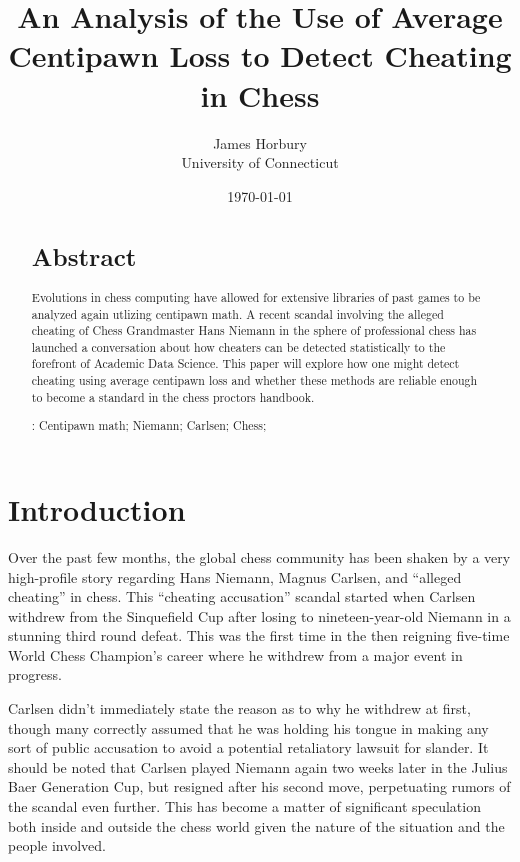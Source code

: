 \documentclass[12pt, letterpaper, titlepage]{article}
\title{An Analysis of the Use of Average Centipawn Loss to Detect Cheating in Chess}
\author{James Horbury\\
    University of Connecticut
}
\date{\today}
\begin{document}
\maketitle

\begin{abstract}
\section*{Abstract}
\label{sec:abs}

Evolutions in chess computing have allowed for extensive libraries of past games to be analyzed again utlizing centipawn math. A recent scandal involving the alleged cheating of Chess Grandmaster Hans Niemann in the sphere of professional chess has launched a conversation about how cheaters can be detected statistically to the forefront of Academic Data Science. This paper will explore how one might detect cheating using average centipawn loss and whether these methods are reliable enough to become a standard in the chess proctors handbook.

\bigskip
\noindent{}:
Centipawn math; 
Niemann;
Carlsen;
Chess;
\end{abstract}

\section*{Introduction}
\label{sec:intro}

Over the past few months, the global chess community has been shaken by a very high-profile story regarding Hans Niemann, Magnus Carlsen, and “alleged cheating” in chess. This “cheating accusation” scandal started when Carlsen withdrew from the Sinquefield Cup after losing to nineteen-year-old Niemann in a stunning third round defeat. This was the first time in the then reigning five-time World Chess Champion's career where he withdrew from a major event in progress.

Carlsen didn't immediately state the reason as to why he withdrew at first, though many correctly assumed that he was holding his tongue in making any sort of public accusation to avoid a potential retaliatory lawsuit for slander. It should be noted that Carlsen played Niemann again two weeks later in the Julius Baer Generation Cup, but resigned after his second move, perpetuating rumors of the scandal even further. This has become a matter of significant speculation both inside and outside the chess world given the nature of the situation and the people involved. 
\end{document}
